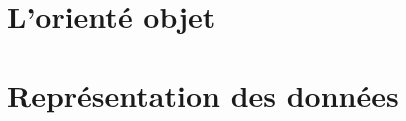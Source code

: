 \documentclass[a4paper,doubleside]{book}
\begin{document}

	
	
	

	
	\chapter{L'orienté objet}
	
	\chapter{Représentation des données}

%
%
%
%

\end{document}
